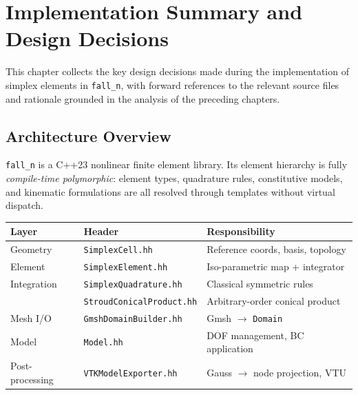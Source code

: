 
\chapter{Implementation Summary and Design Decisions}
\label{ch:implementation}

This chapter collects the key design decisions made during the implementation
of simplex elements in \texttt{fall\_n}, with forward references to the
relevant source files and rationale grounded in the analysis of the preceding
chapters.


\section{Architecture Overview}
\label{sec:architecture}

\texttt{fall\_n} is a C++23 nonlinear finite element library.  Its element
hierarchy is fully \emph{compile-time polymorphic}: element types, quadrature
rules, constitutive models, and kinematic formulations are all resolved through
templates without virtual dispatch.

\begin{center}
\begin{tabular}{lll}
  \toprule
  Layer & Header & Responsibility \\
  \midrule
  Geometry        & \texttt{SimplexCell.hh}          & Reference coords, basis, topology \\
  Element         & \texttt{SimplexElement.hh}        & Iso-parametric map + integrator \\
  Integration     & \texttt{SimplexQuadrature.hh}     & Classical symmetric rules \\
                  & \texttt{StroudConicalProduct.hh}  & Arbitrary-order conical product \\
  Mesh I/O        & \texttt{GmshDomainBuilder.hh}     & Gmsh $\to$ \texttt{Domain} \\
  Model           & \texttt{Model.hh}                 & DOF management, BC application \\
  Post-processing & \texttt{VTKModelExporter.hh}      & Gauss $\to$ node projection, VTU \\
  \bottomrule
\end{tabular}
\end{center}


